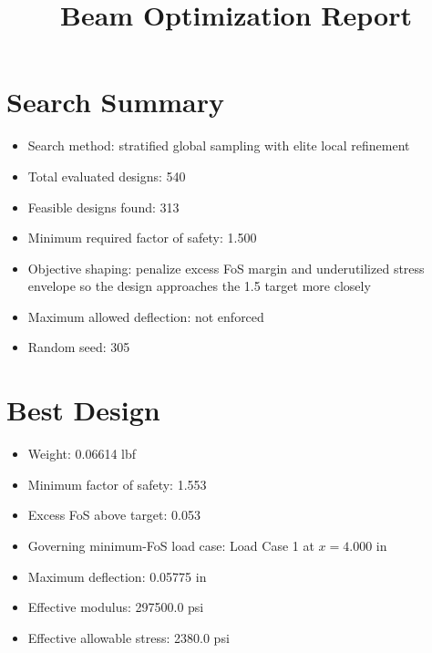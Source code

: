 \documentclass[11pt]{article}
\title{Beam Optimization Report}
\date{}
\begin{document}
\maketitle

\section*{Search Summary}
\begin{itemize}
\item Search method: stratified global sampling with elite local refinement
\item Total evaluated designs: 540
\item Feasible designs found: 313
\item Minimum required factor of safety: 1.500
\item Objective shaping: penalize excess FoS margin and underutilized stress envelope so the design approaches the 1.5 target more closely
\item Maximum allowed deflection: not enforced
\item Random seed: 305
\end{itemize}

\section*{Best Design}
\begin{itemize}
\item Weight: 0.06614 lbf
\item Minimum factor of safety: 1.553
\item Excess FoS above target: 0.053
\item Governing minimum-FoS load case: Load Case 1 at $x=4.000$ in
\item Maximum deflection: 0.05775 in
\item Effective modulus: 297500.0 psi
\item Effective allowable stress: 2380.0 psi
\end{itemize}
\end{document}
